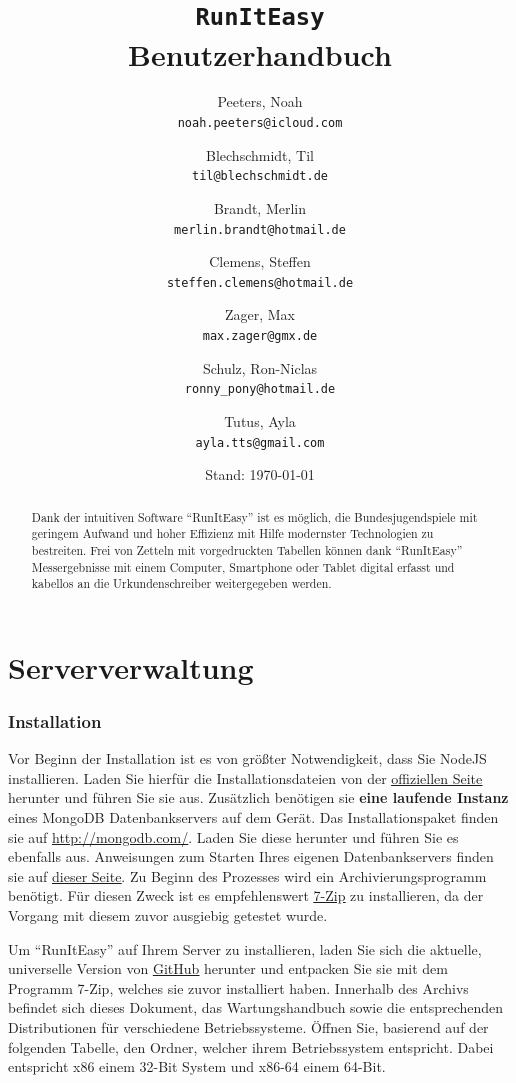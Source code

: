 \documentclass[11pt,a4paper,titlepage,german]{article}
\title{\texttt{RunItEasy}\\ \textbf{Benutzerhandbuch}}
\author{
	Peeters, Noah\\ \texttt{noah.peeters@icloud.com}
	\and
	Blechschmidt, Til\\ \texttt{til@blechschmidt.de}
	\and
	Brandt, Merlin\\ \texttt{merlin.brandt@hotmail.de}
	\and
	Clemens, Steffen\\ \texttt{steffen.clemens@hotmail.de}
	\and
	Zager, Max\\ \texttt{max.zager@gmx.de}
	\and
	Schulz, Ron-Niclas\\ \texttt{ronny\_pony@hotmail.de}
	\and
	Tutus, Ayla\\ \texttt{ayla.tts@gmail.com}
	
}
\date{Stand: \today}
\begin{document}
	\maketitle
	
	\begin{abstract}
		Dank der intuitiven Software “RunItEasy” ist es möglich, die Bundesjugendspiele mit geringem Aufwand und hoher Effizienz mit Hilfe modernster Technologien zu bestreiten. Frei von Zetteln mit vorgedruckten Tabellen können dank “RunItEasy” Messergebnisse mit einem Computer, Smartphone oder Tablet digital erfasst und kabellos an die Urkundenschreiber weitergegeben werden. 
	\end{abstract}
	
	\newpage
	
	\tableofcontents
	
	\newpage
	
	\part{Serververwaltung}
		\section{Installation}
			\label{install}
			Vor Beginn der Installation ist es von größter Notwendigkeit, dass Sie NodeJS installieren. Laden Sie hierfür die Installationsdateien von der \href{https://nodejs.org/en/download/}{\underline{\color{blue}offiziellen Seite}} herunter und führen Sie sie aus. Zusätzlich benötigen sie \textbf{eine laufende Instanz} eines MongoDB Datenbankservers auf dem Gerät. Das Installationspaket finden sie auf \href{https://www.mongodb.com/download-center}{\underline{\color{blue}http://mongodb.com/}}. Laden Sie diese herunter und führen Sie es ebenfalls aus. Anweisungen zum Starten Ihres eigenen Datenbankservers finden sie auf \href{https://docs.mongodb.com/manual/tutorial/install-mongodb-on-windows/#run-mongodb-community-edition}{\underline{\color{blue}dieser Seite}}. Zu Beginn des Prozesses wird ein Archivierungsprogramm benötigt. Für diesen Zweck ist es empfehlenswert \href{http://www.7-zip.org/download.html}{\underline{\color{blue}7-Zip}} zu installieren, da der Vorgang mit diesem zuvor ausgiebig getestet wurde.
			
			Um “RunItEasy” auf Ihrem Server zu installieren, laden Sie sich die aktuelle, universelle Version von \href{https://github.com/TheMegaTB/BJS/releases}{\underline{\color{blue}GitHub}} herunter und entpacken Sie sie mit dem Programm 7-Zip, welches sie zuvor installiert haben. Innerhalb des Archivs befindet sich dieses Dokument, das Wartungshandbuch sowie die entsprechenden Distributionen für verschiedene Betriebssysteme. Öffnen Sie, basierend auf der folgenden Tabelle, den Ordner, welcher ihrem Betriebssystem entspricht. Dabei entspricht x86 einem 32-Bit System und x86-64 einem 64-Bit.
\end{document}
